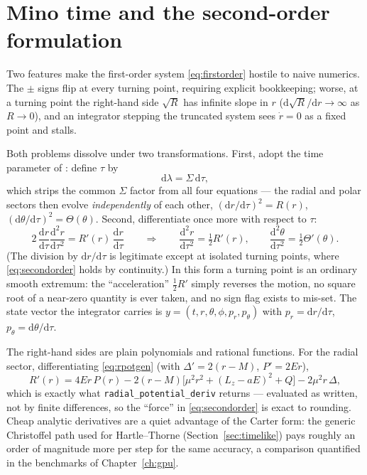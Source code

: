 \section{Mino time and the second-order formulation}
\label{sec:mino}

Two features make the first-order system \eqref{eq:firstorder} hostile
to naive numerics. The $\pm$ signs flip at every turning point, requiring
explicit bookkeeping; worse, at a turning point the right-hand side
$\sqrt{R}$ has infinite slope in $r$ ($\mathrm{d}\sqrt R/\mathrm{d}r \to
\infty$ as $R \to 0$), and an integrator stepping the truncated system
sees $\dot r = 0$ as a fixed point and stalls.

Both problems dissolve under two transformations. First, adopt the time
parameter of \citet{Mino2003}: define $\tau$ by
\begin{equation}
\mathrm{d}\lambda = \Sigma\,\mathrm{d}\tau,
\label{eq:minotime}
\end{equation}
which strips the common $\Sigma$ factor from all four equations — the
radial and polar sectors then evolve \emph{independently} of each other,
$(\mathrm{d}r/\mathrm{d}\tau)^2 = R(r)$,
$(\mathrm{d}\theta/\mathrm{d}\tau)^2 = \Theta(\theta)$. Second,
differentiate once more with respect to $\tau$:
\begin{equation}
2\,\frac{\mathrm{d}r}{\mathrm{d}\tau}
   \frac{\mathrm{d}^2r}{\mathrm{d}\tau^2}
 = R'(r)\,\frac{\mathrm{d}r}{\mathrm{d}\tau}
\qquad\Longrightarrow\qquad
\frac{\mathrm{d}^2 r}{\mathrm{d}\tau^2} = \tfrac{1}{2}R'(r),
\qquad
\frac{\mathrm{d}^2 \theta}{\mathrm{d}\tau^2} =
\tfrac{1}{2}\Theta'(\theta).
\label{eq:secondorder}
\end{equation}
(The division by $\mathrm{d}r/\mathrm{d}\tau$ is legitimate except at
isolated turning points, where \eqref{eq:secondorder} holds by
continuity.) In this form a turning point is an ordinary smooth
extremum: the ``acceleration'' $\tfrac12 R'$ simply reverses the motion,
no square root of a near-zero quantity is ever taken, and no sign flag
exists to mis-set. The state vector the integrator carries is
$y = (t, r, \theta, \phi, p_r, p_\theta)$ with
$p_r = \mathrm{d}r/\mathrm{d}\tau$,
$p_\theta = \mathrm{d}\theta/\mathrm{d}\tau$.

The right-hand sides are plain polynomials and rational functions. For
the radial sector, differentiating \eqref{eq:rpotgen} (with
$\Delta' = 2(r - M)$, $P' = 2Er$),
\begin{equation}
R'(r) = 4Er\,P(r) - 2(r-M)\bigl[\mu^2 r^2 + (L_z - aE)^2 + Q\bigr]
- 2\mu^2 r\,\Delta ,
\label{eq:rprime}
\end{equation}
which is exactly what \texttt{radial\_potential\_deriv} returns —
evaluated as written, not by finite differences, so the ``force'' in
\eqref{eq:secondorder} is exact to rounding. Cheap analytic derivatives
are a quiet advantage of the Carter form: the generic Christoffel path
used for Hartle--Thorne (Section~\ref{sec:timelike}) pays roughly an
order of magnitude more per step for the same accuracy, a comparison
quantified in the benchmarks of Chapter~\ref{ch:gpu}.

